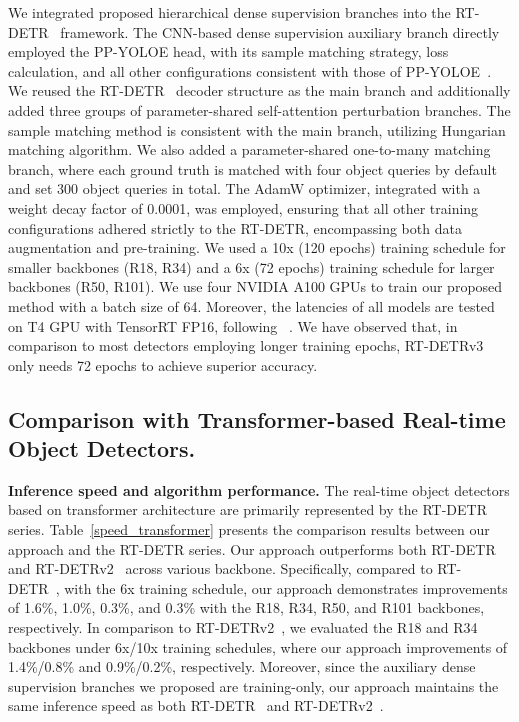 \documentclass[10pt,twocolumn,letterpaper]{article}
\begin{document}
We integrated proposed hierarchical dense supervision branches into the RT-DETR~\cite{zhao2024rt-detr} framework. The CNN-based dense supervision auxiliary branch directly employed the PP-YOLOE head, with its sample matching strategy, loss calculation, and all other configurations consistent with those of PP-YOLOE~\cite{xu2022ppyoloe}. We reused the RT-DETR~\cite{zhao2024rt-detr} decoder structure as the main branch and additionally added three groups of parameter-shared self-attention perturbation branches. The sample matching method is consistent with the main branch, utilizing Hungarian matching algorithm. We also added a parameter-shared one-to-many matching branch, where each ground truth is matched with four object queries by default and set 300 object queries in total. The AdamW optimizer, integrated with a weight decay factor of 0.0001, was employed, ensuring that all other training configurations adhered strictly to the RT-DETR\cite{zhao2024rt-detr}, encompassing both data augmentation and pre-training. We used a 10x (120 epochs) training schedule for smaller backbones (R18, R34) and a 6x (72 epochs) training schedule for larger backbones (R50, R101). We use four NVIDIA A100 GPUs to train our proposed method with a batch size of 64. Moreover, the latencies of all models are tested on T4 GPU with TensorRT FP16, following ~\cite{zhao2024rt-detr}. We have observed that, in comparison to most detectors employing longer training epochs, RT-DETRv3 only needs 72 epochs to achieve superior accuracy.

\subsection{Comparison with Transformer-based Real-time Object Detectors.}
\textbf{Inference speed and algorithm performance.} The real-time object detectors based on transformer architecture are primarily represented by the RT-DETR series. Table~\ref{speed_transformer} presents the comparison results between our approach and the RT-DETR series. Our approach outperforms both RT-DETR~\cite{zhao2024rt-detr} and RT-DETRv2~\cite{lv2024rt-detrv2} across various backbone. Specifically, compared to RT-DETR~\cite{zhao2024rt-detr}, with the 6x training schedule, our approach demonstrates improvements of 1.6\%, 1.0\%, 0.3\%, and 0.3\% with the R18, R34, R50, and R101 backbones, respectively. In comparison to RT-DETRv2~\cite{lv2024rt-detrv2}, we evaluated the R18 and R34 backbones under 6x/10x training schedules, where our approach improvements of 1.4\%/0.8\% and 0.9\%/0.2\%, respectively. Moreover, since the auxiliary dense supervision branches we proposed are training-only, our approach maintains the same inference speed as both RT-DETR~\cite{zhao2024rt-detr} and RT-DETRv2~\cite{lv2024rt-detrv2}. 
\end{document}
